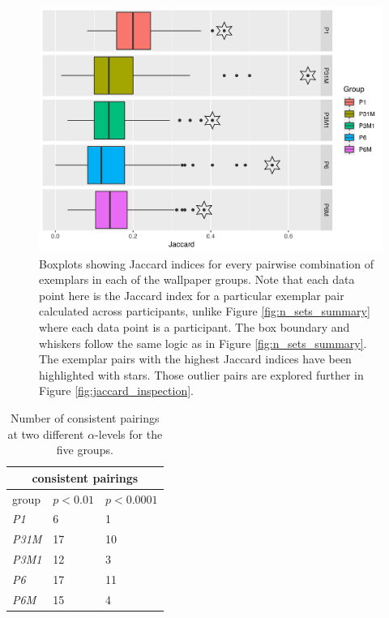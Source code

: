 \documentclass[11pt, twoside]{article}
\begin{document}
\begin{figure}[t]
	\centering
	\includegraphics[width=\linewidth]{./figures/jaccard_summary.pdf}
	\caption{Boxplots showing Jaccard indices for every pairwise combination of exemplars in each of the wallpaper groups. Note that each data point here is the Jaccard index for a particular exemplar pair calculated across participants, unlike Figure \ref{fig:n_sets_summary} where each data point is a participant. The box boundary and whiskers follow the same logic as in Figure \ref{fig:n_sets_summary}. The exemplar pairs with the highest Jaccard indices have been highlighted with stars. Those outlier pairs are explored further in Figure \ref{fig:jaccard_inspection}.}
	\label{fig:jaccard_summary}
\end{figure}

\begin{table}[H]
	\centering
	\begin{tabular}[t]{ |p{2cm}||p{2cm}|p{2cm}| }
		\hline
		\multicolumn{3}{|c|}{consistent pairings} \\
		\hline
		group & $p<0.01$ & $p<0.0001$ \\
		\hline
		\textit{P1}   & 6  & 1  \\
		\textit{P31M} & 17 & 10 \\
		\textit{P3M1} & 12 & 3  \\
		\textit{P6}   & 17 & 11 \\
		\textit{P6M}  & 15 & 4  \\
		\hline
	\end{tabular}
	\caption{Number of consistent pairings at two different $\alpha$-levels for the five groups.  }
	\label{table:pairings}
\end{table}
\end{document}
